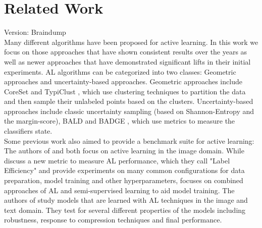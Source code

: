 \documentclass[]{article}
\begin{document}
\section{Related Work}
{\color{red} Version: Braindump}\\
Many different algorithms have been proposed for active learning. 
In this work we focus on those approaches that have shown consistent results over the years as well as newer approaches that have demonstrated significant lifts in their initial experiments.
AL algorithms can be categorized into two classes: Geometric approaches and uncertainty-based approaches.
Geometric approaches include CoreSet \cite{sener2017active} and TypiClust \cite{hacohen2022active}, which use clustering techniques to partition the data and then sample their unlabeled points based on the clusters.
Uncertainty-based approaches include classic uncertainty sampling (based on Shannon-Entropy and the margin-score), BALD \cite{kirsch2019batchbald} and BADGE \cite{ashdeep}, which use metrics to measure the classifiers state. \\ [1mm]
%
Some previous work also aimed to provide a benchmark suite for active learning:
The authors of \cite{beck2021effective} and \cite{li2022empirical} both focus on active learning in the image domain.
While \cite{beck2021effective} discuss a new metric to measure AL performance, which they call "Label Efficiency" and provide experiments on many common configurations for data preparation, model training and other hyperparameters, \cite{li2022empirical} focuses on combined approaches of AL and semi-supervised learning to aid model training.
The authors of \cite{hu2021towards} study models that are learned with AL techniques in the image and text domain.
They test for several different properties of the models including robustness, response to compression techniques and final performance.



\end{document}
